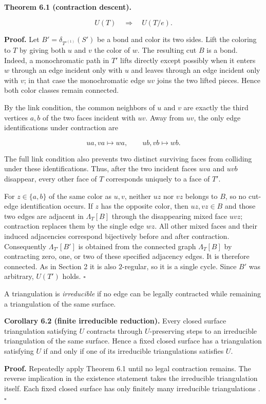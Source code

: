 \documentclass[11pt]{article}
\begin{document}
\textbf{Theorem 6.1 (contraction descent).}

\[
U(T)\quad\Longrightarrow\quad U(T/e).
\]

\textbf{Proof.} Let $B'=\delta_{T'^{(1)}}(S')$ be a bond and color its two sides.
Lift the coloring to $T$ by giving both $u$ and $v$ the color of $w$. The
resulting cut $B$ is a bond. Indeed, a monochromatic path in $T'$ lifts
directly except possibly when it enters $w$ through an edge incident only
with $u$ and leaves through an edge incident only with $v$; in that case the
monochromatic edge $uv$ joins the two lifted pieces. Hence both color classes
remain connected.

By the link condition, the common neighbors of $u$ and $v$ are exactly the
third vertices $a,b$ of the two faces incident with $uv$. Away from $uv$, the
only edge identifications under contraction are

\[
ua,va\mapsto wa,
\qquad
ub,vb\mapsto wb.
\]

The full link condition also prevents two distinct surviving faces from
colliding under these identifications. Thus, after the two incident faces
$uva$ and $uvb$ disappear, every other face of $T$ corresponds uniquely to a
face of $T'$.

For $z\in\{a,b\}$ of the same color as $u,v$, neither $uz$ nor $vz$ belongs
to $B$, so no cut-edge identification occurs. If $z$ has the opposite color,
then $uz,vz\in B$ and those two edges are adjacent in $\Lambda_T[B]$ through
the disappearing mixed face $uvz$; contraction replaces them by the single
edge $wz$. All other mixed faces and their induced adjacencies correspond
bijectively before and after contraction. Consequently
$\Lambda_{T'}[B']$ is obtained from the connected graph $\Lambda_T[B]$ by
contracting zero, one, or two of these specified adjacency edges. It is
therefore connected. As in Section 2 it is also $2$-regular, so it is a single
cycle. Since $B'$ was arbitrary, $U(T')$ holds. $\square$

A triangulation is \emph{irreducible} if no edge can be legally contracted while
remaining a triangulation of the same surface.

\textbf{Corollary 6.2 (finite irreducible reduction).} Every closed surface
triangulation satisfying $U$ contracts through $U$-preserving steps to an
irreducible triangulation of the same surface. Hence a fixed closed surface
has a triangulation satisfying $U$ if and only if one of its irreducible
triangulations satisfies $U$.

\textbf{Proof.} Repeatedly apply Theorem 6.1 until no legal contraction remains.
The reverse implication in the existence statement takes the irreducible
triangulation itself. Each fixed closed surface has only finitely many
irreducible triangulations \cite{joret-wood}. $\square$
\end{document}
